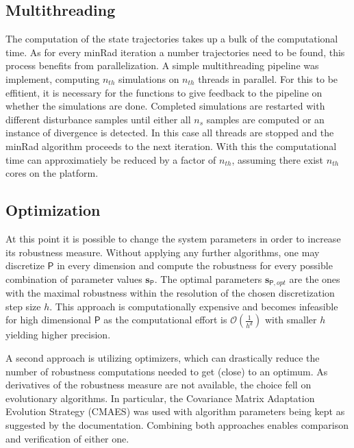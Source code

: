 \subsection{Multithreading} \label{mt}
    
    The computation of the state trajectories takes up a bulk of the computational time. As for every minRad iteration a number trajectories need to be found, this process benefits from parallelization. A simple multithreading pipeline was implement, computing $n_{th}$ simulations on $n_{th}$ threads in parallel. For this to be effitient, it is necessary for the functions to give feedback to the pipeline on whether the simulations are done. Completed simulations are restarted with different disturbance samples until either all $n_s$ samples are computed or an instance of divergence is detected. In this case all threads are stopped and the minRad algorithm proceeds to the next iteration. 
    With this the computational time can approximatiely be reduced by a factor of $n_{th}$, assuming there exist $n_{th}$ cores on the platform. 

\subsection{Optimization} \label{opt}
    
    At this point it is possible to change the system parameters in order to increase its robustness measure.
    Without applying any further algorithms, one may discretize $\mathsf{P}$ in every dimension and compute the robustness for every possible combination of parameter values $\mathbf{s}_{\mathsf{P}}$. The optimal parameters $\mathbf{s}_{\mathsf{P},opt}$ are the ones with the maximal robustness within the resolution of the chosen discretization step size $h$. This approach is computationally expensive and becomes infeasible for high dimensional $\mathsf{P}$ as the computational effort is $\mathcal{O}(\frac{1}{h^d})$ with smaller $h$ yielding higher precision. 
    
    A second approach is utilizing optimizers, which can drastically reduce the number of robustness computations needed to get (close) to an optimum. As derivatives of the robustness measure are not available, the choice fell on evolutionary algorithms. In particular, the Covariance Matrix Adaptation Evolution Strategy (CMAES) was used with algorithm parameters being kept as suggested by the documentation. Combining both approaches enables comparison and verification of either one. 


